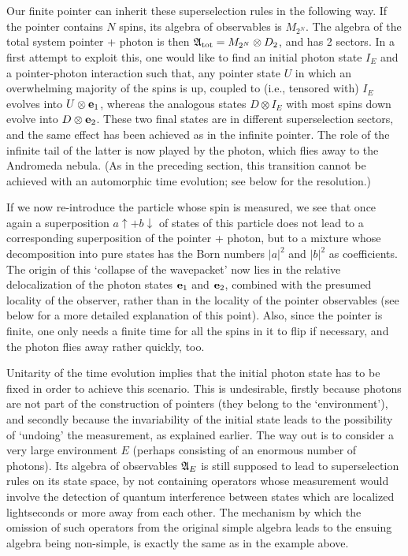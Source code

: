 \documentclass[12pt,titlepage]{article}
\newcommand{\A}{\frak A}
\newcommand{\ot}{\otimes}
\newcommand{\up}{\uparrow}
\newcommand{\dow}{\downarrow}
\begin{document}
Our finite pointer can inherit these superselection rules in the following way.
If the pointer
contains $N$ spins, its algebra of observables is $M_{2^N}$. The algebra of the
total system pointer + photon is then $\A_{\rm tot}=M_{2^N}\ot D_2$, and has 2
sectors.   In a
first attempt to exploit this, one would like to find an initial photon state
$I_E$ and a
pointer-photon interaction such that,  any   pointer state $U$ in which an
overwhelming majority of the spins is up, coupled to (i.e., tensored with)
$I_E$ evolves into
$U\ot {\bf e}_1$, whereas the analogous states $D\ot I_E$ with most spins down
evolve  into
$D\ot {\bf e}_2$.  These two final states are in different superselection
sectors, and the same
effect has been achieved as in the infinite pointer. The role of the infinite
tail of the latter is
now played by the photon, which flies away to the Andromeda nebula. (As in the
preceding section,
this transition cannot be achieved with an automorphic time evolution; see
below for the resolution.)

 If we now re-introduce the
particle whose  spin is measured, we see that once again a superposition $a
\up+b\dow$ of states of this
particle does not lead to a corresponding superposition of the pointer +
photon, but to a mixture
whose decomposition into pure states has the Born numbers $|a|^2$ and $|b|^2$
as coefficients.
The origin of this `collapse of the wavepacket' now lies in the relative
delocalization of the
photon states ${\bf e}_1$ and ${\bf e}_2$, combined with the presumed locality
of the observer,
rather than in the locality of the pointer observables (see below for a more
detailed explanation of
this point). Also, since the pointer is finite, one only needs a finite time
for all the spins in  it
to flip if necessary, and the photon flies away rather quickly, too.

Unitarity of the time evolution implies that the initial photon state has to be
fixed in order to
achieve this scenario. This is undesirable, firstly because photons are not
part of the construction
of pointers (they belong to the `environment'), and secondly because the
invariability of the
initial state leads to the possibility of `undoing' the measurement, as
explained earlier.
The way out is to consider a very large environment $E$ (perhaps consisting of
an enormous number of
photons). Its algebra of observables $\A_E$ is still supposed to lead to
superselection rules on its
state space, by not containing   operators whose measurement would involve the
detection of quantum
interference  between states which are localized lightseconds or more away from
each other. The
mechanism by which the omission of such operators from the original simple
algebra leads to the ensuing
algebra being non-simple, is exactly the same as in the example above.
\end{document}
